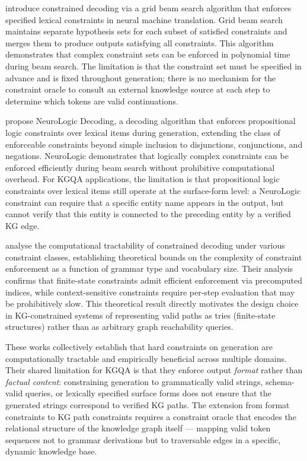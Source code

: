 \citet{hokamp2017lexically} introduce constrained decoding via a grid beam search algorithm that enforces specified lexical constraints in neural machine translation. Grid beam search maintains separate hypothesis sets for each subset of satisfied constraints and merges them to produce outputs satisfying all constraints. This algorithm demonstrates that complex constraint sets can be enforced in polynomial time during beam search. The limitation is that the constraint set must be specified in advance and is fixed throughout generation; there is no mechanism for the constraint oracle to consult an external knowledge source at each step to determine which tokens are valid continuations.

\citet{lu2021neurologic} propose NeuroLogic Decoding, a decoding algorithm that enforces propositional logic constraints over lexical items during generation, extending the class of enforceable constraints beyond simple inclusion to disjunctions, conjunctions, and negations. NeuroLogic demonstrates that logically complex constraints can be enforced efficiently during beam search without prohibitive computational overhead. For KGQA applications, the limitation is that propositional logic constraints over lexical items still operate at the surface-form level: a NeuroLogic constraint can require that a specific entity name appears in the output, but cannot verify that this entity is connected to the preceding entity by a verified KG edge.

\citet{zhang2023tractable} analyse the computational tractability of constrained decoding under various constraint classes, establishing theoretical bounds on the complexity of constraint enforcement as a function of grammar type and vocabulary size. Their analysis confirms that finite-state constraints admit efficient enforcement via precomputed indices, while context-sensitive constraints require per-step evaluation that may be prohibitively slow. This theoretical result directly motivates the design choice in KG-constrained systems of representing valid paths as tries (finite-state structures) rather than as arbitrary graph reachability queries.

These works collectively establish that hard constraints on generation are computationally tractable and empirically beneficial across multiple domains. Their shared limitation for KGQA is that they enforce output \textit{format} rather than \textit{factual content}: constraining generation to grammatically valid strings, schema-valid queries, or lexically specified surface forms does not ensure that the generated strings correspond to verified KG paths. The extension from format constraints to KG path constraints requires a constraint oracle that encodes the relational structure of the knowledge graph itself --- mapping valid token sequences not to grammar derivations but to traversable edges in a specific, dynamic knowledge base.


